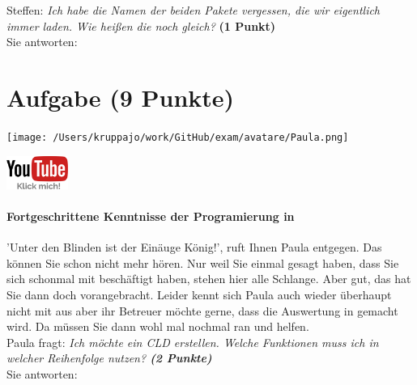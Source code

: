 \documentclass[a4paper, 9pt]{scrartcl}\usepackage[]{graphicx}\usepackage[]{xcolor}
\begin{document}
Steffen: \textit{Ich habe die Namen der beiden \Rlogo Pakete vergessen, die wir eigentlich immer laden. Wie heißen die noch gleich?} \textbf{(1 Punkt)}\\[1ex]
Sie antworten:\\[2Ex] 
\clearpage

\section{Aufgabe \hfill (9 Punkte)}



 
\begin{minipage}[t]{0.5\textwidth}
\texttt{[image: /Users/kruppajo/work/GitHub/exam/avatare/Paula.png]}
\end{minipage}
\begin{minipage}[t]{0.5\textwidth}
\hfill
\href{https://www.youtube.com/playlist?list=PLe51bCp9JvEFUnFqaJG5aRmON9i1ZbOYC}{\includegraphics[width = 2cm]{img/youtube}}
\end{minipage}
\vspace{1ex}



\paragraph{Fortgeschrittene Kenntnisse der Programierung in \Rlogo}

'Unter den Blinden ist der Einäuge König!', ruft Ihnen Paula entgegen. Das können Sie schon nicht mehr hören. Nur weil Sie einmal gesagt haben, dass Sie sich schonmal mit \Rlogo beschäftigt haben, stehen hier alle Schlange. Aber gut, das hat Sie dann doch vorangebracht. Leider kennt sich Paula auch wieder überhaupt nicht mit \Rlogo aus aber ihr Betreuer möchte gerne, dass die Auswertung in \Rlogo gemacht wird. Da müssen Sie dann wohl mal nochmal ran und helfen.\\[1Ex]

Paula fragt: \textit{Ich möchte ein CLD erstellen. Welche Funktionen muss ich in welcher Reihenfolge nutzen? \textbf{(2 Punkte)}}\\[1ex]
Sie antworten:\\[2Ex]
\end{document}
